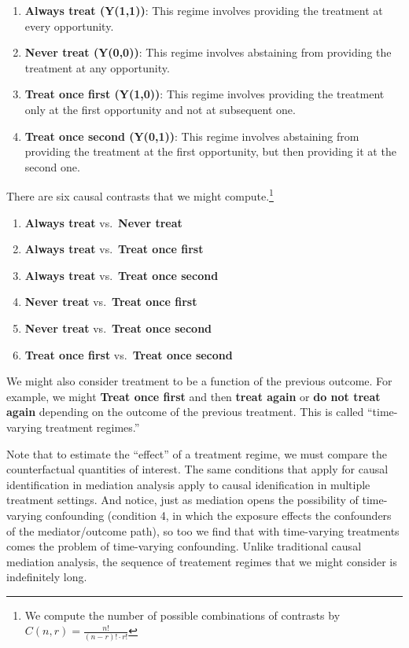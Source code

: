 \documentclass[
  singlecolumn]{report}
\providecommand{\tightlist}{%
  \setlength{\itemsep}{0pt}\setlength{\parskip}{0pt}}\usepackage{longtable,booktabs,array}
\begin{document}
\begin{enumerate}
\def\labelenumi{\arabic{enumi}.}
\item
  \textbf{Always treat (Y(1,1))}: This regime involves providing the
  treatment at every opportunity.
\item
  \textbf{Never treat (Y(0,0))}: This regime involves abstaining from
  providing the treatment at any opportunity.
\item
  \textbf{Treat once first (Y(1,0))}: This regime involves providing the
  treatment only at the first opportunity and not at subsequent one.
\item
  \textbf{Treat once second (Y(0,1))}: This regime involves abstaining
  from providing the treatment at the first opportunity, but then
  providing it at the second one.
\end{enumerate}

There are six causal contrasts that we might compute.\footnote{We
  compute the number of possible combinations of contrasts by
  \(C(n, r) = \frac{n!}{(n-r)! \cdot r!}\)}

\begin{enumerate}
\def\labelenumi{\arabic{enumi}.}
\tightlist
\item
  \textbf{Always treat} vs.~\textbf{Never treat}
\item
  \textbf{Always treat} vs.~\textbf{Treat once first}
\item
  \textbf{Always treat} vs.~\textbf{Treat once second}
\item
  \textbf{Never treat} vs.~\textbf{Treat once first}
\item
  \textbf{Never treat} vs.~\textbf{Treat once second}
\item
  \textbf{Treat once first} vs.~\textbf{Treat once second}
\end{enumerate}

We might also consider treatment to be a function of the previous
outcome. For example, we might \textbf{Treat once first} and then
\textbf{treat again} or \textbf{do not treat again} depending on the
outcome of the previous treatment. This is called ``time-varying
treatment regimes.''

Note that to estimate the ``effect'' of a treatment regime, we must
compare the counterfactual quantities of interest. The same conditions
that apply for causal identification in mediation analysis apply to
causal idenification in multiple treatment settings. And notice, just as
mediation opens the possibility of time-varying confounding (condition
4, in which the exposure effects the confounders of the mediator/outcome
path), so too we find that with time-varying treatments comes the
problem of time-varying confounding. Unlike traditional causal mediation
analysis, the sequence of treatement regimes that we might consider is
indefinitely long.
\end{document}
